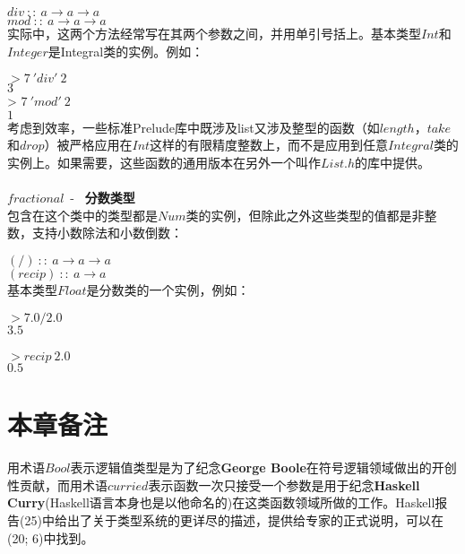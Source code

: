 \noindent\hspace*{1cm} $div~::~a \rightarrow a \rightarrow a$\\
\hspace*{1cm} $mod~::~a \rightarrow a \rightarrow a$\\

实际中，这两个方法经常写在其两个参数之间，并用单引号括上。基本类型$Int$和$Integer$是Integral类的实例。例如：

\noindent\hspace*{1cm} $> 7~'div'~2$\\
\hspace*{1cm} $3$\\

\noindent\hspace*{1cm} > $7~'mod'~2$\\
\hspace*{1cm} $1$\\

考虑到效率，一些标准Prelude库中既涉及list又涉及整型的函数（如$length$，$take$和$drop$）被严格应用在$Int$这样的有限精度整数上，而不是应用到任意$Integral$类的实例上。如果需要，这些函数的通用版本在另外一个叫作$List.h$的库中提供。
\\
\\
\noindent$fractional$~-~ \textbf{分数类型}\\
包含在这个类中的类型都是$Num$类的实例，但除此之外这些类型的值都是非整数，支持小数除法和小数倒数：

\noindent\hspace*{1cm} $(/)~::~a \rightarrow a \rightarrow a$\\
\hspace*{1cm} $(recip)~::~a \rightarrow a$\\

基本类型$Float$是分数类的一个实例，例如：

\noindent\hspace*{1cm} $> 7.0 / 2.0$\\
\hspace*{1cm} $3.5$\\
\\
\noindent\hspace*{1cm} $> recip~2.0$\\
\hspace*{1cm} $0.5$\\

\section{本章备注}
用术语$Bool$表示逻辑值类型是为了纪念\textbf{George
Boole}在符号逻辑领域做出的开创性贡献，而用术语$curried$表示函数一次只接受一个参数是用于纪念\textbf{Haskell
Curry}(Haskell语言本身也是以他命名的)在这类函数领域所做的工作。Haskell报告(25)中给出了关于类型系统的更详尽的描述，提供给专家的正式说明，可以在(20; 6)中找到。

